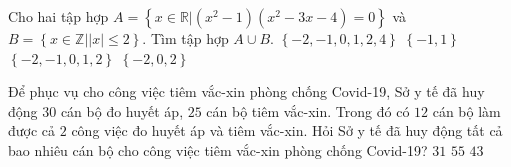 \begin{ex}%
	Cho hai tập hợp $A=\left\{ x\in \mathbb{R}\big|\left(x^2-1 \right)\left( x^2-3x-4 \right)=0 \right\}$ và $B=\left\{ x\in \mathbb{Z}\big|\left| x \right|\leq 2 \right\}$. Tìm tập hợp $A\cup B$.
	\choice
	{\True $\left\{ -2,-1,0,1,2, 4\right\}$}
	{$\left\{-1, 1 \right\}$}
	{$\left\{ -2,-1,0,1,2\right\}$}
	{$\left\{-2, 0, 2\right\}$}
\end{ex}

\begin{ex}%
	Để phục vụ cho công việc tiêm vắc-xin phòng chống Covid-19, Sở y tế đã huy động $30$ cán bộ đo huyết áp, $25$ cán bộ tiêm vắc-xin. Trong đó có $12$ cán bộ làm được cả $2$ công việc đo huyết áp và tiêm vắc-xin. Hỏi Sở y tế đã huy động tất cả bao nhiêu cán bộ cho công việc tiêm vắc-xin phòng chống Covid-19?
	{$31$}
	{$55$}
	{\True $43$}
\end{ex}


